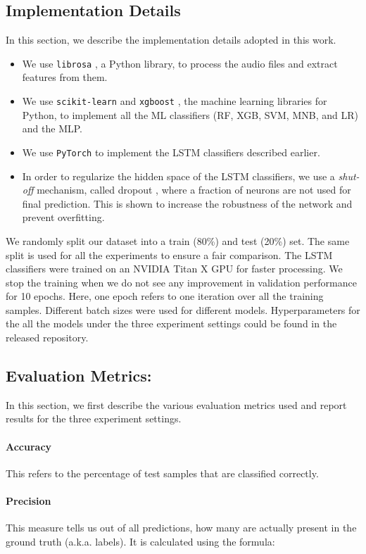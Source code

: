 \documentclass[conference]{IEEEtran}
\begin{document}
\subsection{Implementation Details}
In this section, we describe the implementation details adopted in this work.
\begin{itemize}
    \item We use \texttt{librosa} \cite{mcfee2015librosa}, a Python library, to process the audio files and extract features from them.
    \item We use \texttt{scikit-learn} and \texttt{xgboost} \cite{pedregosa2011scikit} \cite{dmlcsgb}, the machine learning libraries for Python, to implement all the ML classifiers (RF, XGB, SVM, MNB, and LR) and the MLP.
    \item We use \texttt{PyTorch} \cite{pytorch} to implement the LSTM classifiers described earlier.
    \item In order to regularize the hidden space of the LSTM classifiers, we use a \textit{shut-off} mechanism, called dropout \cite{srivastava2014dropout}, where a fraction of neurons are not used for final prediction. This is shown to increase the robustness of the network and prevent overfitting.
\end{itemize}

We randomly split our dataset into a train (80\%) and test (20\%) set. The same split is used for all the experiments to ensure a fair comparison. The LSTM classifiers were trained on an NVIDIA Titan X GPU for faster processing. We stop the training when we do not see any improvement in validation performance for 10 epochs. Here, one epoch refers to one iteration over all the training samples. Different batch sizes were used for different models. Hyperparameters for the all the models under the three experiment settings could be found in the released repository.

\subsection{Evaluation Metrics:}
In this section, we first describe the various evaluation metrics used and report results for the three experiment settings.
\paragraph{Accuracy} This refers to the percentage of test samples that are classified correctly.
\paragraph{Precision} This measure tells us out of all predictions, how many are actually present in the ground truth (a.k.a. labels). It is calculated using the formula:
\end{document}
